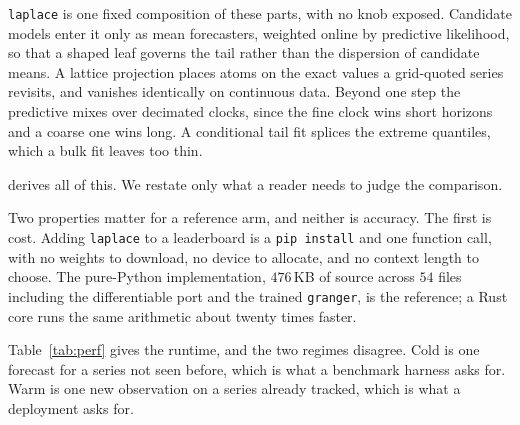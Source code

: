 \documentclass[article]{jss}
\providecommand{\proglang}[1]{\textsf{#1}}
\providecommand{\code}[1]{\texttt{#1}}
\begin{document}
\code{laplace} is one fixed composition of these parts, with no knob exposed.
Candidate models enter it only as mean forecasters, weighted online by
predictive likelihood, so that a shaped leaf governs the tail rather than the
dispersion of candidate means. A lattice projection places atoms on the exact
values a grid-quoted series revisits, and vanishes identically on continuous
data. Beyond one step the predictive mixes over decimated clocks, since the fine
clock wins short horizons and a coarse one wins long. A conditional tail fit
splices the extreme quantiles, which a bulk fit leaves too thin.

\citet{cotton2026transforms} derives all of this. We restate only what a reader
needs to judge the comparison.

Two properties matter for a reference arm, and neither is accuracy. The first is
cost. Adding \code{laplace} to a leaderboard is a \code{pip install} and one
function call, with no weights to download, no device to allocate, and no
context length to choose. The pure-\proglang{Python} implementation, $476$\,KB of source across $54$
files including the differentiable port and the trained \code{granger}, is the reference; a \proglang{Rust} core runs the same arithmetic about
twenty times faster.

Table~\ref{tab:perf} gives the runtime, and the two regimes disagree. Cold is
one forecast for a series not seen before, which is what a benchmark harness
asks for. Warm is one new observation on a series already tracked, which is what
a deployment asks for.
\end{document}
